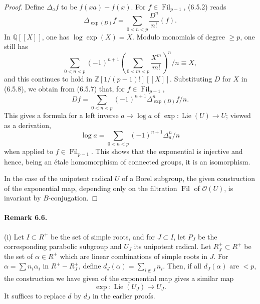 \documentclass[11pt]{article}
\newcommand{\Lie}{\operatorname{Lie}}
\providecommand{\Fil}{\operatorname{Fil}}
\providecommand{\OO}{\mathcal O}
\begin{document}
\begin{proof}
Define \(\Delta_a f\) to be \(f(xa)-f(x)\). For \(f\in\Fil_{p-1}\), (6.5.2) reads
\begin{equation}
  \Delta_{\exp(D)} f=\sum_{0<n<p}\frac{D^n}{n!}(f).
  \tag{6.5.7}
\end{equation}
In \(\mathbb Q[[X]]\), one has \(\log\exp(X)=X\). Modulo monomials of degree \(\ge p\), one still has
\begin{equation}
  \sum_{0<n<p}(-1)^{n+1}\left(\sum_{0<m<p}\frac{X^m}{m!}\right)^n/n \equiv X,
  \tag{6.5.8}
\end{equation}
and this continues to hold in \(\mathbb Z[1/(p-1)!][[X]]\). Substituting \(D\) for \(X\) in
(6.5.8), we obtain from (6.5.7) that, for \(f\in\Fil_{p-1}\),
\begin{equation}
  Df=\sum_{0<n<p}(-1)^{n+1}\Delta_{\exp(D)}^n f/n.
  \tag{6.5.9}
\end{equation}
This gives a formula for a left inverse \(a\mapsto\log a\) of
\(\exp:\Lie(U)\to U\); viewed as a derivation,
\begin{equation}
  \log a=\sum_{0<n<p}(-1)^{n+1}\Delta_a^n/n
  \tag{6.5.10}
\end{equation}
when applied to \(f\in\Fil_{p-1}\). This shows that the exponential is injective and hence,
being an étale homomorphism of connected groups, it is an isomorphism.

In the case of the unipotent radical \(U\) of a Borel subgroup, the given construction of the
exponential map, depending only on the filtration \(\Fil\) of \(\OO(U)\), is invariant by
\(B\)-conjugation.
\end{proof}

\paragraph{Remark 6.6.}
(i) Let \(I\subset R^+\) be the set of simple roots, and for \(J\subset I\), let \(P_J\) be the
corresponding parabolic subgroup and \(U_J\) its unipotent radical. Let
\(R_J^+\subset R^+\) be the set of \(\alpha\in R^+\) which are linear combinations of simple
roots in \(J\). For \(\alpha=\sum n_i\alpha_i\) in \(R^+-R_J^+\), define
\(d_J(\alpha)=\sum_{i\notin J} n_i\). Then, if all \(d_J(\alpha)\) are \(<p\), the construction
we have given of the exponential map gives a similar map
\begin{equation}
  \exp:\Lie(U_J)\longrightarrow U_J.
  \tag{6.6.1}
\end{equation}
It suffices to replace \(d\) by \(d_J\) in the earlier proofs.
\end{document}
